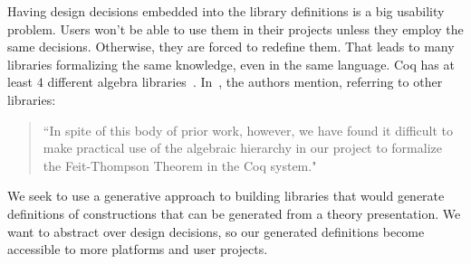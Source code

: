 Having design decisions embedded into the library definitions is a big usability problem. Users won't be able to use them in their projects unless they employ the same decisions. Otherwise, they are forced to redefine them. That leads to many libraries formalizing the same knowledge, even in the same language. Coq has at least $4$ different algebra libraries~\cite{Gonthier2009,Geuvers2002,coq-contribs-algebra,Spitters2010}. In~\cite{Gonthier2009}, the authors mention, referring to other libraries:  
\begin{quote}
    ``In spite of this body of prior work, however, we have found it
    difficult to make practical use of the algebraic hierarchy in our project to
    formalize the Feit-Thompson Theorem in the Coq system."
\end{quote}

We seek to use a generative approach to building libraries that would generate definitions of constructions that can be generated from a theory presentation. We want to abstract over design decisions, so our generated definitions become accessible to more platforms and user projects.  

